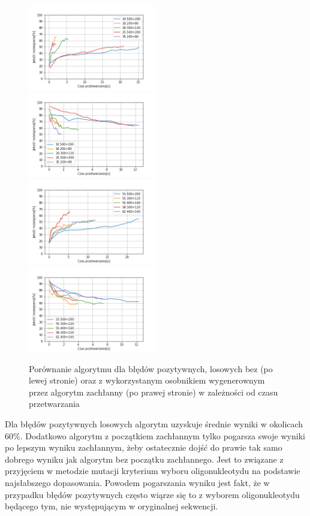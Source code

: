 \documentclass{article}
\begin{document}
\begin{figure}[H]
\includegraphics[width=0.5\textwidth]{Czaspoz-los1.png}
\includegraphics[width=0.5\textwidth]{Czaspoz-los-greedy1.png}
\includegraphics[width=0.5\textwidth]{Czaspoz-los2.png}
\includegraphics[width=0.5\textwidth]{Czaspoz-los-greedy2.png}
\caption{Porównanie algorytmu dla błędów pozytywnych, losowych bez (po lewej stronie) oraz z wykorzystanym osobnikiem wygenerownym przez algorytm zachłanny (po prawej stronie) w zależności od czasu przetwarzania}
\end{figure}
Dla błędów pozytywnych losowych algorytm uzyskuje średnie wyniki w okolicach 60\%. Dodatkowo algorytm z początkiem zachłannym tylko pogarsza swoje wyniki po lepszym wyniku zachłannym, żeby ostatecznie dojść do prawie tak samo dobrego wyniku jak algorytm bez początku zachłannego. Jest to związane z przyjęciem w metodzie mutacji kryterium wyboru oligonukleotydu na podstawie najsłabszego dopasowania. Powodem pogarszania wyniku jest fakt, że w przypadku błędów pozytywnych często wiąrze się to z wyborem oligonukleotydu będącego tym, nie występującym w oryginalnej sekwencji.
\end{document}
